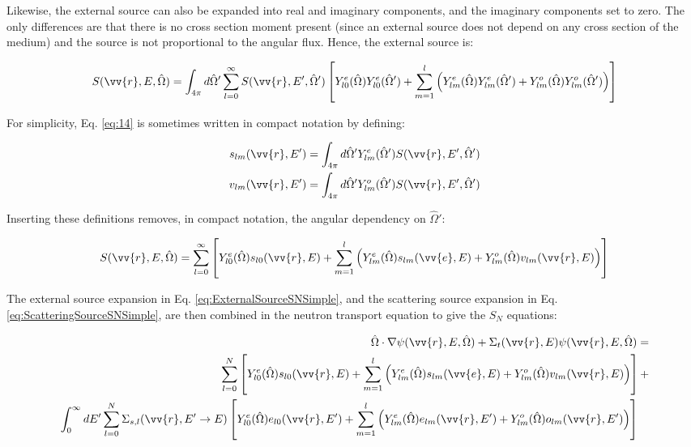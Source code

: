 \documentclass[10pt]{article}
\newcommand{\hO}{\hat{\Omega}}
\begin{document}
\begin{flushleft}
Likewise, the external source can also be expanded into real and imaginary components, and the imaginary components set to zero. The only differences are that there is no cross section moment present (since an external source does not depend on any cross section of the medium) and the source is not proportional to the angular flux. Hence, the external source is:

\begin{equation}
\label{eq:14}
S(\vv{r},E, \hO  )=\int_{4\pi}^{}d\hO  '\sum_{l=0}^{\infty}S(\vv{r},E', \hO  ')\left\lbrack Y_{l0}^e(\hO  )Y_{l0}^e(\hO  ')+\sum_{m=1}^{l}\left(Y_{lm}^e(\hO  )Y_{lm}^{e}(\hO  ')+Y_{lm}^o(\hO  )Y_{lm}^{o}(\hO  ')\right)\right\rbrack 
\end{equation}

\begin{tcolorbox}[breakable]
For simplicity, Eq. \eqref{eq:14} is sometimes written in compact notation by defining:

\begin{equation}
\begin{aligned}
s_{lm}(\vv{r},E')=\int_{4\pi}^{}d\hO  'Y_{lm}^e(\hO  ')S(\vv{r}, E',\hO  ')\\
v_{lm}(\vv{r},E')=\int_{4\pi}^{}d\hO  'Y_{lm}^o(\hO  ')S(\vv{r}, E',\hO  ')\\
\end{aligned}
\end{equation}

Inserting these definitions removes, in compact notation, the angular dependency on \(\hO  '\):

\begin{equation}
\label{eq:ExternalSourceSNSimple}
\begin{aligned}
S(\vv{r},E, \hO  )=\sum_{l=0}^{\infty}\left\lbrack Y_{l0}^e(\hO  )s_{l0}(\vv{r},E)+\sum_{m=1}^{l}\left(Y_{lm}^e(\hO  )s_{lm}(\vv{e},E)+Y_{lm}^o(\hO  )v_{lm}(\vv{r},E)\right)\right\rbrack
\end{aligned}
\end{equation}
\end{tcolorbox}

The external source expansion in Eq. \eqref{eq:ExternalSourceSNSimple}, and the scattering source expansion in Eq. \eqref{eq:ScatteringSourceSNSimple}, are then combined in the neutron transport equation to give the \(S_N\) equations:

\begin{equation}
\label{eq:SnGeneral}
\begin{aligned}
 \hO  \cdot\nabla\psi(\vv{r}, E, \hO  ) + 
 \Sigma_t(\vv{r},E)\psi(\vv{r}, E, \hO  ) = \\
\sum_{l=0}^{N}\left\lbrack Y_{l0}^e(\hO  )s_{l0}(\vv{r},E)+\sum_{m=1}^{l}\left(Y_{lm}^e(\hO  )s_{lm}(\vv{e},E)+Y_{lm}^o(\hO  )v_{lm}(\vv{r},E)\right)\right\rbrack+\\
\int_{0}^{\infty}dE' \sum_{l=0}^{N}\Sigma_{s,l}(\vv{r}, E'\rightarrow E)\left\lbrack Y_{l0}^e(\hO  )e_{l0}(\vv{r},E')+\sum_{m=1}^{l}\left(Y_{lm}^e(\hO  )e_{lm}(\vv{r},E')+Y_{lm}^o(\hO  )o_{lm}(\vv{r},E')\right)\right\rbrack\quad\\
\end{aligned}
\end{equation}


\end{flushleft}
\end{document}

